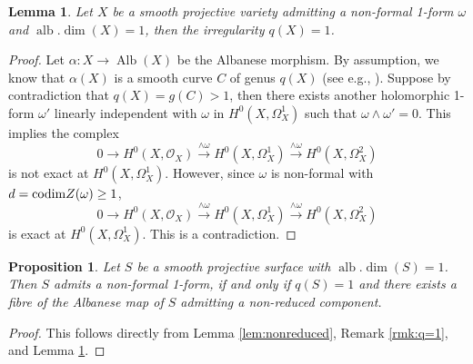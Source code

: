 \documentclass[a4paper,12pt,reqno]{amsart}
\newtheorem{lemma}[theorem]{Lemma}
\newtheorem{proposition}[theorem]{Proposition}
\newtheorem{corollary}[theorem]{Corollary}
\theoremstyle{question}
\theoremstyle{definition}
\theoremstyle{remark}
\theoremstyle{cited}
\theoremstyle{citeddef}
\def\CC{{\mathbb C}}
\DeclareMathOperator{\Alb}{Alb}
\DeclareMathOperator{\alb}{alb}
\begin{document}
\begin{lemma}\label{lem:exist-nonhodge+albdim1}
    Let $X$ be a smooth projective variety admitting a non-formal 1-form $\omega$ and $\alb.\dim(X)=1$, then the irregularity $q(X)=1$.
\end{lemma}
\begin{proof}
    Let $\alpha\colon X\to \Alb(X)$ be the Albanese morphism. By assumption, we know that $\alpha(X)$ is a smooth curve $C$ of genus $q(X)$ (see e.g., \cite[Proposition 9.19]{Ueno75}).  Suppose by contradiction that $q(X)=g(C)>1$, then there exists another holomorphic 1-form $\omega'$ linearly independent with $\omega$ in $H^0(X,\Omega_X^1)$ such that $\omega\wedge \omega'=0$. This implies the complex $$0\to H^0(X, \mathcal{O}_X)\overset{\wedge\omega}{\longrightarrow} H^0(X,\Omega^1_X)\overset{\wedge\omega}{\longrightarrow} H^0(X,\Omega^2_X)$$ is not exact at $H^0(X,\Omega^1_X)$. However, since $\omega$ is non-formal with $d=\textnormal{codim} Z(\omega)\geq 1$, $$0\to H^0(X, \mathcal{O}_X)\overset{\wedge\omega}{\longrightarrow} H^0(X,\Omega^1_X)\overset{\wedge\omega}{\longrightarrow} H^0(X,\Omega^2_X)$$  is exact at $H^0(X,\Omega^1_X)$. This is a contradiction.
\end{proof}

\begin{proposition}
Let $S$ be a smooth projective surface with $\alb.\dim(S)=1$. Then $S$ admits a non-formal 1-form, if and only if $q(S)=1$ and there exists a fibre of the Albanese map of $S$ admitting a non-reduced component.
\end{proposition}

\begin{proof}
    This follows directly from Lemma \ref{lem:nonreduced}, Remark \ref{rmk:q=1}, and Lemma \ref{lem:exist-nonhodge+albdim1}.
\end{proof}



\end{document}
